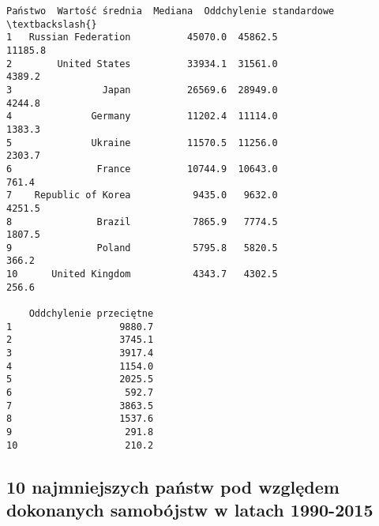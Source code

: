 \documentclass[11pt]{article}
\makeatletter
\newcommand{\boxspacing}{\kern\kvtcb@left@rule\kern\kvtcb@boxsep}
\newcommand{\prompt}[4]{
        {\ttfamily\llap{{\color{#2}[#3]:\hspace{3pt}#4}}\vspace{-\baselineskip}}
    }
\makeatother
\begin{document}
            \begin{tcolorbox}[breakable, size=fbox, boxrule=.5pt, pad at break*=1mm, opacityfill=0]
\prompt{Out}{outcolor}{8}{\boxspacing}
\begin{Verbatim}[commandchars=\\\{\}]
               Państwo  Wartość średnia  Mediana  Oddchylenie standardowe  \textbackslash{}
1   Russian Federation          45070.0  45862.5                  11185.8
2        United States          33934.1  31561.0                   4389.2
3                Japan          26569.6  28949.0                   4244.8
4              Germany          11202.4  11114.0                   1383.3
5              Ukraine          11570.5  11256.0                   2303.7
6               France          10744.9  10643.0                    761.4
7    Republic of Korea           9435.0   9632.0                   4251.5
8               Brazil           7865.9   7774.5                   1807.5
9               Poland           5795.8   5820.5                    366.2
10      United Kingdom           4343.7   4302.5                    256.6

    Oddchylenie przeciętne
1                   9880.7
2                   3745.1
3                   3917.4
4                   1154.0
5                   2025.5
6                    592.7
7                   3863.5
8                   1537.6
9                    291.8
10                   210.2
\end{Verbatim}
\end{tcolorbox}
        
    \hypertarget{najmniejszych-paux144stw-pod-wzglux119dem-dokonanych-samobuxf3jstw-w-latach-1990-2015}{%
\subsection{10 najmniejszych państw pod względem dokonanych samobójstw w
latach
1990-2015}\label{najmniejszych-paux144stw-pod-wzglux119dem-dokonanych-samobuxf3jstw-w-latach-1990-2015}}
\end{document}
